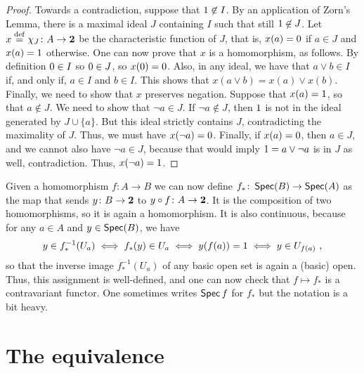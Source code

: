 \documentclass[a4paper]{article}
\begin{document}
\begin{proof}
    Towards a contradiction, suppose that $1\not\in I$. By an application of
    Zorn's Lemma, there is a maximal ideal $J$ containing $I$ such that still
    $1\not\in J$. Let $x \stackrel{\mathrm{def}}{=} \chi_J \colon A \to \mathbf{2}$ be the characteristic function of $J$,
    that is, $x(a) = 0$ if $a \in J$ and $x(a) = 1$ otherwise. One can
    now prove that $x$ is a homomorphism, as follows. By definition $0 \in
    I$ so $0 \in J$, so $x(0) = 0$. Also, in any ideal, we have that
    $a \vee b \in I$ if, and only if, $a \in I$ and $b \in I$. This shows that
    $x(a \vee b) = x(a) \vee x(b)$. Finally, we need to show that $x$ preserves
    negation. Suppose that $x(a) = 1$, so that $a \not\in J$. We need to
    show that $\neg a \in J$. If $\neg a \not\in J$, then $1$ is not in the
    ideal generated by $J \cup \{a\}$. But this ideal strictly contains $J$,
    contradicting the maximality of $J$. Thus, we must have $x(\neg a) = 0$.
    Finally, if $x(a) = 0$, then $a \in J$, and we cannot also have $\neg a
    \in J$, because that would imply $1 = a \vee \neg a$ is in $J$ as well,
    contradiction. Thus, $x(\neg a) = 1$.
\end{proof}
Given a homomorphism $f \colon A \to B$ we can now define $f_* \colon \operatorname*{\mathsf{Spec}}(B) \to \operatorname*{\mathsf{Spec}}(A)$
as the map that sends $y \colon B \to \mathbf{2}$ to $y \circ f \colon A \to
\mathbf{2}$. It is the composition of two homomorphisms, so it is again a
homomorphism. It is also continuous, because for any $a \in A$ and $y \in
\operatorname*{\mathsf{Spec}}(B)$, we have
\[ y \in f_*^{-1}(U_a) \iff f_*(y) \in U_a \iff y(f(a)) = 1 \iff y \in
U_{f(a)}\ , \]
so that the inverse image $f_*^{-1}(U_a)$ of any basic open set is again a
(basic) open.
Thus, this assignment is well-defined, and one can now check that $f \mapsto
f_*$ is a contravariant functor. One sometimes writes $\operatorname*{\mathsf{Spec}} f$ for $f_*$ but
the notation is a bit heavy.

\section{The equivalence}

\end{document}
